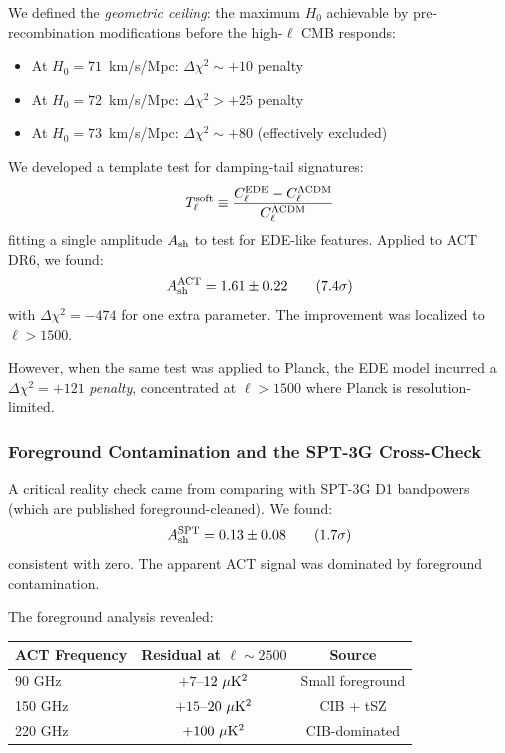 \documentclass[twocolumn,showpacs,preprintnumbers,amsmath,amssymb,prd]{revtex4-2}
\begin{document}
We defined the \emph{geometric ceiling}: the maximum $H_0$ achievable by pre-recombination modifications before the high-$\ell$ CMB responds:
\begin{itemize}
    \item At $H_0 = 71$~km/s/Mpc: $\Delta\chi^2 \sim +10$ penalty
    \item At $H_0 = 72$~km/s/Mpc: $\Delta\chi^2 > +25$ penalty
    \item At $H_0 = 73$~km/s/Mpc: $\Delta\chi^2 \sim +80$ (effectively excluded)
\end{itemize}

We developed a template test for damping-tail signatures:
\begin{equation}
T_\ell^{\rm soft} \equiv \frac{C_\ell^{\rm EDE} - C_\ell^{\rm \Lambda CDM}}{C_\ell^{\rm \Lambda CDM}}
\end{equation}
fitting a single amplitude $A_{\rm sh}$ to test for EDE-like features. Applied to ACT DR6, we found:
\begin{equation}
A_{\rm sh}^{\rm ACT} = 1.61 \pm 0.22 \qquad (7.4\sigma)
\end{equation}
with $\Delta\chi^2 = -474$ for one extra parameter. The improvement was localized to $\ell > 1500$.

However, when the same test was applied to Planck, the EDE model incurred a $\Delta\chi^2 = +121$ \textit{penalty}, concentrated at $\ell > 1500$ where Planck is resolution-limited.

\subsubsection{Foreground Contamination and the SPT-3G Cross-Check}

A critical reality check came from comparing with SPT-3G D1 bandpowers (which are published foreground-cleaned). We found:
\begin{equation}
A_{\rm sh}^{\rm SPT} = 0.13 \pm 0.08 \qquad (1.7\sigma)
\end{equation}
consistent with zero. The apparent ACT signal was dominated by foreground contamination.

The foreground analysis revealed:
\begin{center}
\begin{tabular}{lcc}
\toprule
ACT Frequency & Residual at $\ell \sim 2500$ & Source \\
\midrule
90 GHz & $+7$--$12~\mu{\rm K}^2$ & Small foreground \\
150 GHz & $+15$--$20~\mu{\rm K}^2$ & CIB + tSZ \\
220 GHz & $+100~\mu{\rm K}^2$ & CIB-dominated \\
\bottomrule
\end{tabular}
\end{center}
\end{document}
